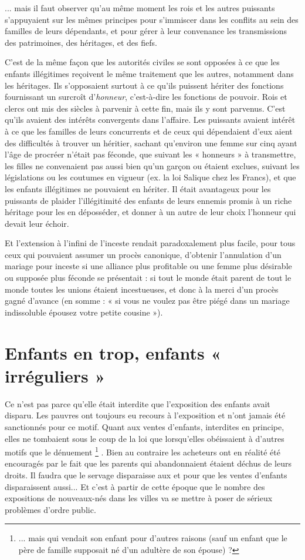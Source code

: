 ... mais il faut observer qu'au même moment les rois et les autres puissants s'appuyaient sur les mêmes principes pour s'immiscer dans les conflits au sein des familles de leurs dépendants, et pour gérer à leur convenance les transmissions des patrimoines, des héritages, et des fiefs. 

 C'est de la même façon que les autorités civiles se sont opposées à ce que les enfants illégitimes reçoivent le même traitement que les autres, notamment dans les héritages. Ils s'opposaient surtout à ce qu'ils puissent hériter des fonctions fournissant un surcroît d'\emph{honneur}, c'est-à-dire les fonctions de pouvoir. Rois et clercs ont mis des siècles à parvenir à cette fin, mais ils y sont parvenus. C'est qu'ils avaient des intérêts convergents dans l'affaire. Les puissants avaient intérêt à ce que les familles de leurs concurrents et de ceux qui dépendaient d'eux aient des difficultés à trouver un héritier, sachant qu'environ une femme sur cinq ayant l'âge de procréer n'était pas féconde, que suivant les « honneurs » à transmettre, les filles ne convenaient pas aussi bien qu'un garçon ou étaient exclues, suivant les législations ou les coutumes en vigueur (ex. la loi Salique chez les Francs), et que les enfants illégitimes ne pouvaient en hériter. Il était avantageux pour les puissants de plaider l'illégitimité des enfants de leurs ennemis promis à un riche héritage pour les en déposséder, et donner à un autre de leur choix l'honneur qui devait leur échoir. 

 Et l'extension à l'infini de l'inceste rendait paradoxalement plus facile, pour tous ceux qui pouvaient assumer un procès canonique, d'obtenir l'annulation d'un mariage pour inceste si une alliance plus profitable ou une femme plus désirable ou supposée plus féconde se présentait : si tout le monde était parent de tout le monde toutes les unions étaient incestueuses, et donc à la merci d'un procès gagné d'avance (en somme : « si vous ne voulez pas être piégé dans un mariage indissoluble épousez votre petite cousine »). 


\section{Enfants en trop, enfants « irréguliers »}

 Ce n'est pas parce qu'elle était interdite que l'exposition des enfants avait disparu. Les pauvres ont toujours eu recours à l'exposition et n'ont jamais été sanctionnés pour ce motif. Quant aux ventes d'enfants, interdites en principe, elles ne tombaient sous le coup de la loi que lorsqu'elles obéissaient à d'autres motifs que le dénuement%
\footnote{... mais qui vendait son enfant pour d'autres raisons (sauf un enfant que le père de famille supposait né d'un adultère de son épouse) ?}%
. Bien au contraire les acheteurs ont en réalité été encouragés par le fait que les parents qui abandonnaient étaient déchus de leurs droits. Il faudra que le servage disparaisse aux  et  pour que les ventes d'enfants disparaissent aussi... Et c'est à partir de cette époque que le nombre des expositions de nouveaux-nés dans les villes va se mettre à poser de sérieux problèmes d'ordre public.

